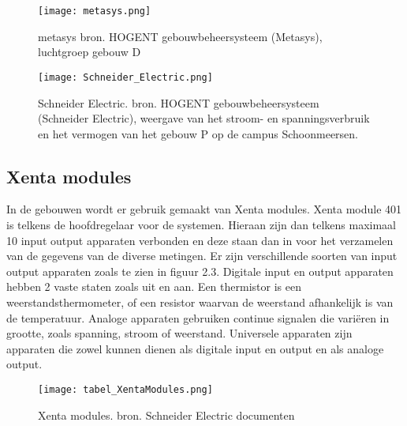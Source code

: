 \begin{figure}
    \centering
    \texttt{[image: metasys.png]}
    \caption[metasys bron. HOGENT gebouwbeheersysteem (Metasys)]{\label{fig:metasys}metasys bron. HOGENT gebouwbeheersysteem (Metasys), luchtgroep gebouw D}
\end{figure}
\begin{figure}
    \centering
    \texttt{[image: Schneider\_Electric.png]}
    \caption[Schneider Electric. bron. HOGENT gebouwbeheersysteem (Schneider Electric)]{\label{fig:schneiderelectric}Schneider Electric. bron. HOGENT gebouwbeheersysteem (Schneider Electric), weergave van het stroom- en spanningsverbruik en het vermogen van het gebouw P op de campus Schoonmeersen.}
\end{figure}

\subsection{Xenta modules}
In de gebouwen wordt er gebruik gemaakt van Xenta modules. Xenta module 401 is telkens de hoofdregelaar voor de systemen. Hieraan zijn dan telkens maximaal 10 input output apparaten verbonden en deze staan dan in voor het verzamelen van de gegevens van de diverse metingen. Er zijn verschillende soorten van input output apparaten zoals te zien in figuur 2.3. Digitale input en output apparaten hebben 2 vaste staten zoals uit en aan. Een thermistor is een weerstandsthermometer, of een resistor waarvan de weerstand afhankelijk is van de temperatuur. Analoge apparaten gebruiken continue signalen die variëren in grootte, zoals spanning, stroom of weerstand. Universele apparaten zijn apparaten die zowel kunnen dienen als digitale input en output en als analoge output.

\begin{figure}
  \centering
  \texttt{[image: tabel\_XentaModules.png]}
  \caption[Xenta modules. bron. Schneider Electric documenten]{\label{fig:xentamodules}Xenta modules. bron. Schneider Electric documenten}
\end{figure}



